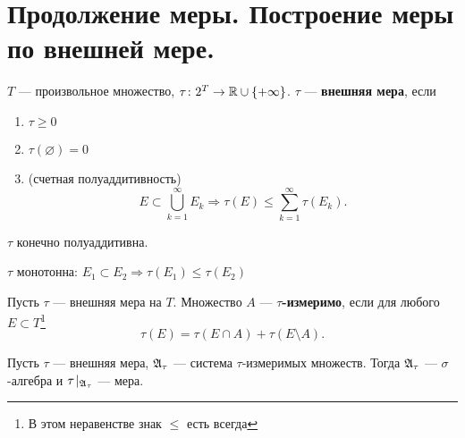 \section{Продолжение меры. Построение меры по внешней мере.}
\begin{defn}
    $ T$ --- произвольное множество, $ \tau \colon 2^{T} \to \mathbb{R} \cup \{+\infty\}$. $ \tau $ --- {\bf внешняя мера}, если  
\begin{enumerate}[label=(\roman*),noitemsep]
    \item  $\tau \ge 0$
	\item $ \tau (\varnothing) = 0$
	\item (счетная полуаддитивность) \[
			E \subset \bigcup_{k=1}^{\infty} E_k \Longrightarrow \tau (E) \le \sum_{k=1}^{\infty} \tau (E_k)
	.\] 
\end{enumerate} 
\begin{note}
    $ \tau $ конечно полуаддитивна.
\end{note}
\begin{note}
	$ \tau $ монотонна: $ E_1 \subset E_2 \Longrightarrow \tau (E_1) \le \tau (E_2) $
\end{note}
\end{defn}
\begin{defn}
	Пусть $ \tau $ --- внешняя мера на $ T$. Множество $ A$ --- {\bf $ \tau $-измеримо}, если для любого $ E \subset T$\footnote{В этом неравенстве знак $ \le $ есть всегда}
	\begin{equation}\label{eq:meas}
		\tau (E) = \tau (E \cap A) + \tau (E \setminus A).
	\end{equation}
\end{defn}
\begin{thm}
    Пусть $ \tau $ --- внешняя мера, $ \mathfrak{A}_{\tau }$ --- система $ \tau $-измеримых множеств. Тогда $ \mathfrak{A}_{\tau }$ --- $ \sigma $-алгебра и $ \tau \! \mid_{\mathfrak{A}_{\tau }}$ --- мера.
\end{thm}
